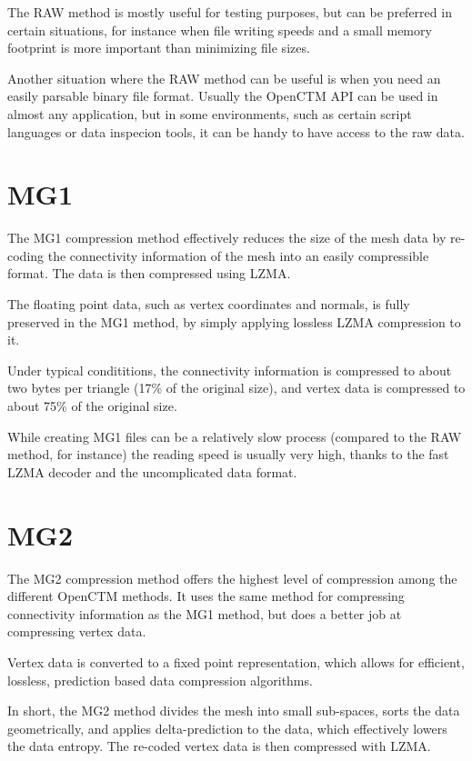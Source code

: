 The RAW method is mostly useful for testing purposes, but can be preferred in
certain situations, for instance when file writing speeds and a small memory
footprint is more important than minimizing file sizes.

Another situation where the RAW method can be useful is when you need an
easily parsable binary file format. Usually the OpenCTM API can be used in
almost any application, but in some environments, such as certain script
languages or data inspecion tools, it can be handy to have access to the
raw data.


\section{MG1}
The MG1 compression method effectively reduces the size of the mesh data
by re-coding the connectivity information of the mesh into an easily
compressible format. The data is then compressed using LZMA.

The floating point data, such as vertex coordinates and normals, is fully
preserved in the MG1 method, by simply applying lossless LZMA compression
to it. 

Under typical condititions, the connectivity information is compressed to
about two bytes per triangle (17\% of the original size), and vertex data
is compressed to about 75\% of the original size.

While creating MG1 files can be a relatively slow process (compared to the
RAW method, for instance) the reading speed is usually very high, thanks to
the fast LZMA decoder and the uncomplicated data format.


\section{MG2}
The MG2 compression method offers the highest level of compression among the
different OpenCTM methods. It uses the same method for compressing connectivity
information as the MG1 method, but does a better job at compressing vertex
data.

Vertex data is converted to a fixed point representation, which allows for
efficient, lossless, prediction based data compression algorithms.

In short, the MG2 method divides the mesh into small sub-spaces, sorts the data
geometrically, and applies delta-prediction to the data, which effectively
lowers the data entropy. The re-coded vertex data is then compressed with
LZMA.

